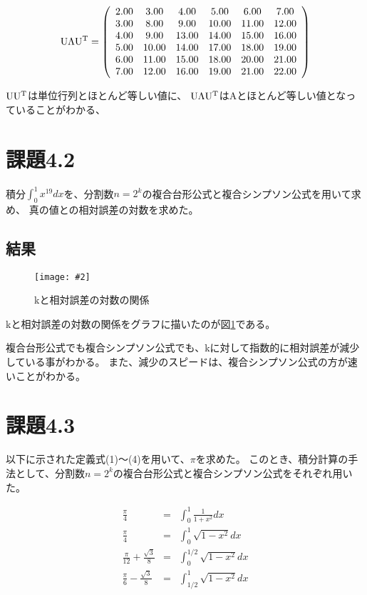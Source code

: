 \documentclass[11pt]{jsarticle}
\newcommand{\fg}[3]{ %
    \begin{figure}
        \centering
        \texttt{[image: \#2]}
        \caption{#3}
        \label{#1}
    \end{figure}
}
\newcommand{\fr}[1]{図\ref{#1}}
\begin{document}
\[
    {\rm U}\Lambda{\rm U}^{\rm T} = 
    \left(\begin{array}{cccccc}
        2.00&3.00&4.00&5.00&6.00&7.00\\
        3.00&8.00&9.00&10.00&11.00&12.00\\
        4.00&9.00&13.00&14.00&15.00&16.00\\
        5.00&10.00&14.00&17.00&18.00&19.00\\
        6.00&11.00&15.00&18.00&20.00&21.00\\
        7.00&12.00&16.00&19.00&21.00&22.00\\
    \end{array}\right)
\]

${\rm U} {\rm U}^{\rm T}$は単位行列とほとんど等しい値に、
${\rm U}\Lambda{\rm U}^{\rm T}$はAとほとんど等しい値となっていることがわかる、

\section{課題4.2}
積分$ \int^{1}_{0} x^{19} dx $を、分割数$n = 2 ^ k$の複合台形公式と複合シンプソン公式を用いて求め、
真の値との相対誤差の対数を求めた。

\subsection{結果}
\fg{fig2}{graph/4_2.png}{kと相対誤差の対数の関係}
kと相対誤差の対数の関係をグラフに描いたのが\fr{fig2}である。

複合台形公式でも複合シンプソン公式でも、kに対して指数的に相対誤差が減少している事がわかる。
また、減少のスピードは、複合シンプソン公式の方が速いことがわかる。

\section{課題4.3}
以下に示された定義式(1)〜(4)を用いて、$\pi$を求めた。
このとき、積分計算の手法として、分割数$n = 2^k$の複合台形公式と複合シンプソン公式をそれぞれ用いた。

\begin{eqnarray}
    \frac{\pi}{4} & = & \int^{1}_{0}\frac{1}{1+x^2}dx \\
    \frac{\pi}{4} & = & \int^{1}_{0}\sqrt{1 - x^2}dx \\
    \frac{\pi}{12}+\frac{\sqrt 3}{8} & = & \int^{1/2}_{0} \sqrt{1 - x^2} dx \\
    \frac{\pi}{6}-\frac{\sqrt 3}{8} & = & \int^{1}_{1/2} \sqrt{1 - x^2} dx
\end{eqnarray}
\end{document}
